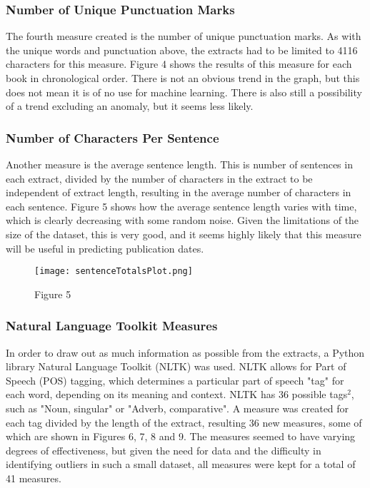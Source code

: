 \documentclass[11pt,a4paper,reqno]{amsart}
\begin{document}
\subsubsection{Number of Unique Punctuation Marks}
The fourth measure created is the number of unique punctuation marks. As with the unique words and punctuation above, the extracts had to be limited to 4116 characters for this measure. Figure 4 shows the results of this measure for each book in chronological order. There is not an obvious trend in the graph, but this does not mean it is of no use for machine learning. There is also still a possibility of a trend excluding an anomaly, but it seems less likely.

\subsubsection{Number of Characters Per Sentence}
Another measure is the average sentence length. This is number of sentences in each extract, divided by the number of characters in the extract to be independent of extract length, resulting in the average number of characters in each sentence. Figure 5 shows how the average sentence length varies with time, which is clearly decreasing with some random noise. Given the limitations of the size of the dataset, this is very good, and it seems highly likely that this measure will be useful in predicting publication dates.

\begin{figure}[!h]
\texttt{[image: sentenceTotalsPlot.png]}
\caption*{Figure 5}
\end{figure}

\subsubsection{Natural Language Toolkit Measures}
In order to draw out as much information as possible from the extracts, a Python library Natural Language Toolkit (NLTK) was used. NLTK allows for Part of Speech (POS) tagging, which determines a particular part of speech "tag" for each word, depending on its meaning and context. NLTK has 36 possible tags$^2$, such as "Noun, singular" or "Adverb, comparative". A measure was created for each tag divided by the length of the extract, resulting 36 new measures, some of which are shown in Figures 6, 7, 8 and 9. The measures seemed to have varying degrees of effectiveness, but given the need for data and the difficulty in identifying outliers in such a small dataset, all measures were kept for a total of 41 measures.
\end{document}
